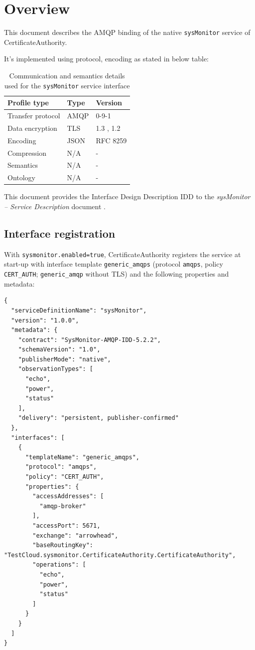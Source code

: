 \documentclass[a4paper]{arrowhead}
\begin{document}
\section{Overview}
\label{sec:overview}

This document describes the AMQP binding of the native \texttt{sysMonitor} service of CertificateAuthority.

It's implemented using protocol, encoding as stated in below table:
\begin{table}[ht!]
  \centering
  \begin{tabular}{|l|l|l|}
    \hline
    \rowcolor{gray!33} Profile type & Type & Version \\ \hline
    Transfer protocol & AMQP & 0-9-1 \cite{amqp091} \\ \hline
    Data encryption & TLS & 1.3 \cite{rfc8446}, 1.2 \cite{rfc5246} \\ \hline
    Encoding & JSON & RFC 8259 \cite{rfc8259} \\ \hline
    Compression & N/A & - \\ \hline
    Semantics & N/A & - \\ \hline
    Ontology & N/A & - \\ \hline
  \end{tabular}
  \caption{Communication and semantics details used for the \texttt{sysMonitor} service interface}
  \label{tab:comunication_semantics_profile}
\end{table}

This document provides the Interface Design Description IDD to the \textit{sysMonitor -- Service Description} document \cite{cau-sysMonitor-sd}.

\subsection{Interface registration}

With \texttt{sysmonitor.enabled=true}, CertificateAuthority registers the service at start-up with interface template \texttt{generic\_\allowbreak{}amqps} (protocol \texttt{amqps}, policy \texttt{CERT\_\allowbreak{}AUTH}; \texttt{generic\_\allowbreak{}amqp} without TLS) and the following properties and metadata:

\begin{lstlisting}[caption={Registered service instance (TestCloud).}]
{
  "serviceDefinitionName": "sysMonitor",
  "version": "1.0.0",
  "metadata": {
    "contract": "SysMonitor-AMQP-IDD-5.2.2",
    "schemaVersion": "1.0",
    "publisherMode": "native",
    "observationTypes": [
      "echo",
      "power",
      "status"
    ],
    "delivery": "persistent, publisher-confirmed"
  },
  "interfaces": [
    {
      "templateName": "generic_amqps",
      "protocol": "amqps",
      "policy": "CERT_AUTH",
      "properties": {
        "accessAddresses": [
          "amqp-broker"
        ],
        "accessPort": 5671,
        "exchange": "arrowhead",
        "baseRoutingKey": "TestCloud.sysmonitor.CertificateAuthority.CertificateAuthority",
        "operations": [
          "echo",
          "power",
          "status"
        ]
      }
    }
  ]
}
\end{lstlisting}
\end{document}
